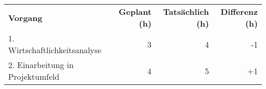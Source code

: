 \begin{tabularx}{\textwidth}{Xrrr}
    \rowcolor{KVGruen}\textbf{Vorgang} & \textbf{Geplant (h)} & \textbf{Tatsächlich (h)} & \textbf{Differenz (h)} \\
    1. Wirtschaftlichkeitsanalyse & 3 & 4 & -1 \\
    \rowcolor{KVGrau}2. Einarbeitung in Projektumfeld & 4   & 5   & +1 \\
\end{tabularx}
    
